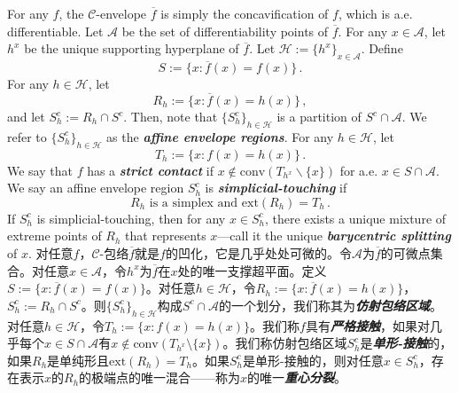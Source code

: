 \documentclass[12pt,letterpaper]{article}
\newenvironment{original}{\color{black}}{}
\newenvironment{translation}{\color{blue}}{}
\theoremstyle{plain}
\theoremstyle{definition}
\theoremstyle{remark}
\newcommand{\C}{\mathcal{C}}
\newcommand{\Ext}{\mathrm{ext}}
\theoremstyle{definition}
\begin{document}
\begin{original}
For any $f$, the $\C$-envelope $\overline{f}$ is simply the concavification of $f$, which is a.e. differentiable. Let $\mathcal{A}$ be the set of differentiability points of $\overline{f}$. For any $x \in \mathcal{A}$, let $h^x$ be the unique supporting hyperplane of $\overline{f}$. Let $\mathcal{H}:=\{h^x\}_{x \in \mathcal{A}}$. Define
\[S := \Big\{x: \overline{f}(x) = f(x)\Big\}\,.\]
For any $h \in \mathcal{H}$, let
\[R_h := \Big\{x: \overline{f}(x) = h(x) \Big\}\,,\]
and let $S^c_h := R_h \cap S^c$. Then, note that $\big\{S^c_h\big\}_{h \in \mathcal{H}}$ is a partition of $S^c \cap \mathcal{A}$. We refer to $\big\{S^c_h\big\}_{h \in \mathcal{H}}$
as the \textit{\textbf{affine envelope regions}}.
For any $h \in \mathcal{H}$, let
\[T_h := \Big\{x: f(x) = h(x)\Big\}\,.\]
We say that $f$ has a \textit{\textbf{strict contact}} if $x \not \in \text{conv}(T_{h^x} \backslash \{x\})$ for a.e. $x \in S \cap \mathcal{A}$.
We say an affine envelope region $S^c_h$ is \textit{\textbf{simplicial-touching}} if
\[R_h \text{ is a simplex} \text{ and } \Ext(R_h) = T_h \,.\]
If $S^c_h$ is simplicial-touching, then for any $x \in S^c_h$, there exists a unique mixture of extreme points of $R_h$ that represents $x$---call it the unique \textit{\textbf{barycentric splitting}} of $x$.
\end{original}
\begin{translation}
对任意$f$，$\C$-包络$\overline{f}$就是$f$的凹化，它是几乎处处可微的。令$\mathcal{A}$为$\overline{f}$的可微点集合。对任意$x \in \mathcal{A}$，令$h^x$为$\overline{f}$在$x$处的唯一支撑超平面。定义$S := \{x: \overline{f}(x) = f(x)\}$。对任意$h \in \mathcal{H}$，令$R_h := \{x: \overline{f}(x) = h(x)\}$，$S^c_h := R_h \cap S^c$。则$\{S^c_h\}_{h \in \mathcal{H}}$构成$S^c \cap \mathcal{A}$的一个划分，我们称其为\textit{\textbf{仿射包络区域}}。对任意$h \in \mathcal{H}$，令$T_h := \{x: f(x) = h(x)\}$。我们称$f$具有\textit{\textbf{严格接触}}，如果对几乎每个$x \in S \cap \mathcal{A}$有$x \notin \text{conv}(T_{h^x} \setminus \{x\})$。我们称仿射包络区域$S^c_h$是\textit{\textbf{单形-接触}}的，如果$R_h$是单纯形且$\Ext(R_h) = T_h$。如果$S^c_h$是单形-接触的，则对任意$x \in S^c_h$，存在表示$x$的$R_h$的极端点的唯一混合——称为$x$的唯一\textit{\textbf{重心分裂}}。
\end{translation}
\end{document}
